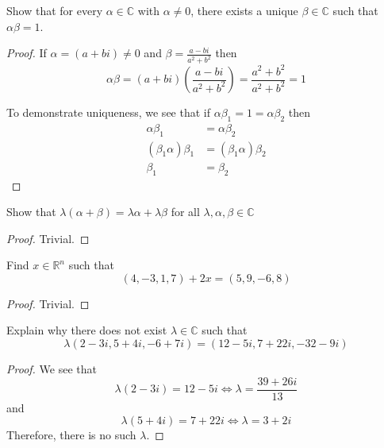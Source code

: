 \begin{exercise} \label{1.A.8}
    Show that for every \( \alpha \in \mathbb{C} \) with \( \alpha \neq 0 \), there exists a unique \( \beta \in \mathbb{C} \) such that \( \alpha \beta = 1 \).
    
    \begin{proof}
        If \( \alpha = (a+bi) \neq 0 \) and \( \beta = \frac{a-bi}{a^2+b^2} \) then
        \[
        \alpha \beta = (a+bi) \left( \frac{a-bi}{a^2+b^2} \right) = \frac{a^2+b^2}{a^2+b^2} = 1
        \]
        
        To demonstrate uniqueness, we see that if \( \alpha \beta_1 = 1 = \alpha \beta_2 \) then
        \begin{align*}
            \alpha \beta_1 &= \alpha \beta_2 \\
            (\beta_1 \alpha) \beta_1 &= (\beta_1 \alpha) \beta_2 \\
            \beta_1 &= \beta_2
        \end{align*}
    \end{proof}
\end{exercise}

\begin{exercise} \label{1.A.9}
    Show that \( \lambda(\alpha+\beta)=\lambda\alpha + \lambda\beta \) for all \( \lambda,\alpha,\beta \in \mathbb{C} \)
    
    \begin{proof}
        Trivial.
    \end{proof}
\end{exercise}

\begin{exercise} \label{1.A.10}
    Find \( x \in \mathbb{R}^n \) such that
    \[ (4,-3,1,7) + 2x = (5,9,-6,8) \]
    
    \begin{proof}
        Trivial.
    \end{proof}
\end{exercise}

\begin{exercise} \label{1.A.11}
    Explain why there does not exist \( \lambda \in \mathbb{C} \) such that
    \[ \lambda (2-3i, 5+4i, -6+7i) = (12-5i, 7+22i, -32-9i) \]
    
    \begin{proof}
        We see that 
        \[ \lambda(2-3i) = 12-5i \Leftrightarrow \lambda = \frac{39+26i}{13} \]
        and
        \[ \lambda(5+4i) = 7+22i \Leftrightarrow \lambda = 3+2i \]
        Therefore, there is no such \( \lambda \).
    \end{proof}
\end{exercise}

